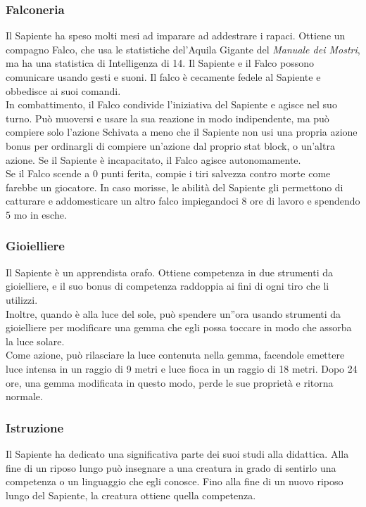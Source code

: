 \subsubsection{Falconeria}
Il Sapiente ha speso molti mesi ad imparare ad addestrare i rapaci. Ottiene un compagno Falco, che usa le statistiche del'Aquila Gigante del \textit{Manuale dei Mostri}, ma ha una statistica di Intelligenza di 14. Il Sapiente e il Falco possono comunicare usando gesti e suoni. Il falco è cecamente fedele al Sapiente e obbedisce ai suoi comandi.\\
In combattimento, il Falco condivide l'iniziativa del Sapiente e agisce nel suo turno. Può muoversi e usare la sua reazione in modo indipendente, ma può compiere solo l'azione Schivata a meno che il Sapiente non usi una propria azione bonus per ordinargli di compiere un'azione dal proprio stat block, o un'altra azione. Se il Sapiente è incapacitato, il Falco agisce autonomamente.\\
Se il Falco scende a 0 punti ferita, compie i tiri salvezza contro morte come farebbe un giocatore. In caso morisse, le abilità del Sapiente gli permettono di catturare e addomesticare un altro falco impiegandoci 8 ore di lavoro e spendendo 5 mo in esche.

\subsubsection{Gioielliere}
Il Sapiente è un apprendista orafo. Ottiene competenza in due strumenti da gioielliere, e il suo bonus di competenza raddoppia ai fini di ogni tiro che li utilizzi.\\
Inoltre, quando è alla luce del sole, può spendere un''ora usando strumenti da gioielliere per modificare  una gemma che egli possa toccare in modo che assorba la luce solare.\\ Come azione, può rilasciare la luce contenuta nella gemma, facendole emettere luce intensa in un raggio di 9 metri e luce fioca in un raggio di 18 metri. Dopo 24 ore, una gemma modificata in questo modo, perde le sue proprietà e ritorna normale.

\subsubsection{Istruzione}
Il Sapiente ha dedicato una significativa parte dei suoi studi alla didattica. Alla fine di un riposo lungo può insegnare a una creatura in grado di sentirlo una competenza o un linguaggio che egli conosce. Fino alla fine di un nuovo riposo lungo del Sapiente, la creatura ottiene quella competenza.

